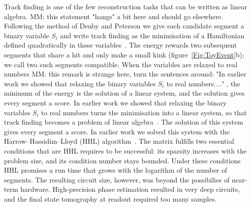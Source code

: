 \documentclass[11pt,a4paper]{article}
\newcommand{\mm}[1]{{\color{purple} MM: #1 }}
\newcommand{\gss}[1]{{\color{teal} #1}}
\begin{document}
Track finding is one of the few reconstruction tasks that can be written as linear algebra.\mm{this statement "hangs" a bit here and should go elsewhere.} Following the method of Denby
and Peterson we give each candidate segment a binary variable $S_i$ and write track finding as the
minimisation of a Hamiltonian  defined quadratically in these variables~\cite{denby1988,peterson1989}. The energy
rewards two subsequent segments that share a hit and only make a small kink
(figure~\ref{Fig:ToyEvent}b); we call two such segments compatible. When the variables are relaxed
to real numbers \mm{this remark is strange here, turn the sentences around: "In earlier work we showed that relaxing the binary variables $S_i$ to real numbers...."}, the minimum of the energy is the solution of a linear system, and the solution
gives every segment a score. \gss{In earlier work we showed that relaxing the binary variables $S_i$ to real numbers turns the minimisation into a linear system, so that track finding becomes a problem of linear algebra~\cite{nicotra2023}. The solution of this system gives every segment a score.} In earlier work we solved this system with the
Harrow--Hassidim--Lloyd (HHL) algorithm~\cite{hhl2009,nicotra2023}. The matrix fulfills two essential
conditions that are HHL requires to be successful: its sparsity increases with the problem size, and its condition number
stays bounded. Under these conditions HHL promises a run time that grows with the logarithm of the
number of segments. The resulting circuit size, however, was beyond the possibilies of near-term hardware. High-precision phase
estimation resulted in very deep circuits, and the final state tomography at readout required too many samples.
\end{document}
